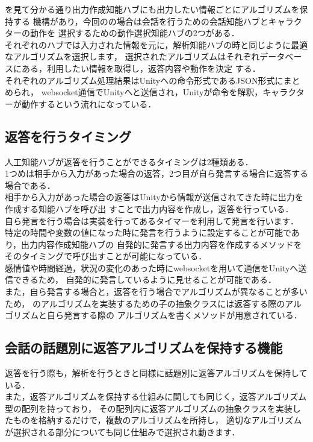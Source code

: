 
を見て分かる通り出力作成知能ハブにも出力したい情報ごとにアルゴリズムを保持する
機構があり，今回のの場合は会話を行うための会話知能ハブとキャラクターの動作を
選択するための動作選択知能ハブの2つがある．
\\
それぞれのハブでは入力された情報を元に，解析知能ハブの時と同じように最適なアルゴリズムを選択します，
選択されたアルゴリズムはそれぞれデータベースにある，利用したい情報を取得し，返答内容や動作を決定
する．
\\
それぞれのアルゴリズム処理結果はUnityへの命令形式であるJSON形式にまとめられ，
websocket通信でUnityへと送信され，Unityが命令を解釈，キャラクターが動作するという流れになっている．

\subsection{返答を行うタイミング}
人工知能ハブが返答を行うことができるタイミングは2種類ある．
\\
1つめは相手から入力があった場合の返答，2つ目が自ら発言する場合に返答する場合である．
\\
相手から入力があった場合の返答はUnityから情報が送信されてきた時に出力を作成する知能ハブを呼び出
すことで出力内容を作成し，返答を行っている．
\\
自ら発言を行う場合は実装を行ってあるタイマーを利用して発言を行います．
特定の時間や変数の値になった時に発言を行うように設定することが可能であり，出力内容作成知能ハブの
自発的に発言する出力内容を作成するメソッドをそのタイミングで呼び出すことが可能になっている．
\\
感情値や時間経過，状況の変化のあった時にwebsocketを用いて通信をUnityへ送信できるため，
自発的に発言しているように見せることが可能である．
\\
また，自ら発言する場合と，返答を行う場合でアルゴリズムが異なることが多いため，
のアルゴリズムを実装するための子の抽象クラスには返答する際のアルゴリズムと自ら発言する際の
アルゴリズムを書くメソッドが用意されている．
\\
\subsection{会話の話題別に返答アルゴリズムを保持する機能}
返答を行う際も，解析を行うときと同様に話題別に返答アルゴリズムを保持している．
\\
また，返答アルゴリズムを保持する仕組みに関しても同じく，返答アルゴリズム型の配列を持っており，
その配列内に返答アルゴリズムの抽象クラスを実装したものを格納するだけで，複数のアルゴリズムを所持し，
適切なアルゴリズムが選択される部分についても同じ仕組みで選択され動きます．\\

